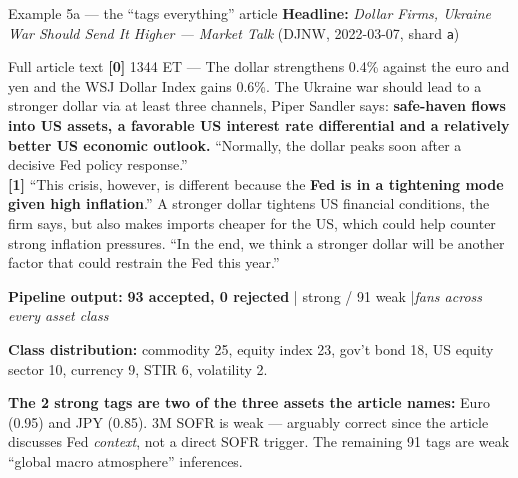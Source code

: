 \documentclass[10pt,aspectratio=169]{beamer}
\begin{document}
\begin{frame}[fragile]{Example 5a --- the ``tags everything'' article}
  \scriptsize
  \textbf{Headline:} \emph{Dollar Firms, Ukraine War Should Send It Higher --- Market Talk}
  \hfill (DJNW, 2022-03-07, shard \texttt{a})

  \vspace{0.3em}
  \begin{block}{Full article text}
    \scriptsize
    \textbf{[0]} 1344 ET --- The dollar strengthens 0.4\% against the euro and yen and the WSJ
    Dollar Index gains 0.6\%. The Ukraine war should lead to a stronger dollar via at least
    three channels, Piper Sandler says: \textbf{safe-haven flows into US assets, a favorable
    US interest rate differential and a relatively better US economic outlook.}
    ``Normally, the dollar peaks soon after a decisive Fed policy response.'' \\[0.3em]
    \textbf{[1]} ``This crisis, however, is different because the \textbf{Fed is in a tightening
    mode given high inflation}.'' A stronger dollar tightens US financial conditions, the firm
    says, but also makes imports cheaper for the US, which could help counter strong inflation
    pressures. ``In the end, we think a stronger dollar will be another factor that could
    restrain the Fed this year.''
  \end{block}

  \vspace{0.3em}
  \textbf{Pipeline output:} \textbf{93 accepted, 0 rejected} \quad| strong / 91 weak
  \quad|\quad \emph{fans across every asset class}

  \vspace{0.2em}
  \centering
  \textbf{Class distribution:} commodity 25, equity index 23, gov't bond 18, US equity sector
  10, currency 9, STIR 6, volatility 2.

  \vspace{0.3em}
  \raggedright
  \textbf{The 2 strong tags are two of the three assets the article names:} Euro (0.95) and
  JPY (0.85). 3M SOFR is weak --- arguably correct since the article discusses Fed
  \emph{context}, not a direct SOFR trigger. The remaining 91 tags are weak ``global macro
  atmosphere'' inferences.
\end{frame}
\end{document}
